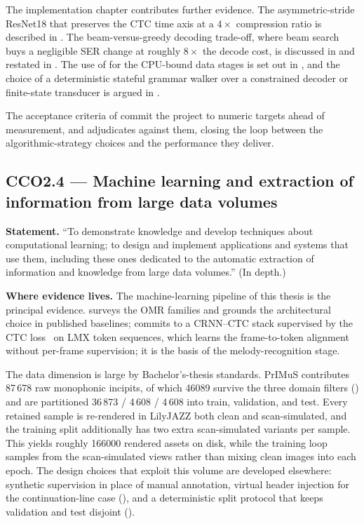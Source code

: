 The implementation chapter contributes further evidence. The
asymmetric-stride ResNet18 that preserves the CTC time axis at a
\(4\times\) compression ratio is described in .
The beam-versus-greedy decoding trade-off, where beam search buys a
negligible SER change at roughly $8\times$ the decode cost, is
discussed in  and restated in
. The use of  for the
CPU-bound data stages is set out in , and the
choice of a deterministic stateful grammar walker over a constrained
decoder or finite-state transducer is argued in
.

The acceptance criteria of  commit the
project to numeric targets ahead of measurement, and 
adjudicates against them, closing the loop between the
algorithmic-strategy choices and the performance they deliver.

\subsection{CCO2.4 — Machine learning and extraction of information
from large data volumes}

\textbf{Statement.}
``To demonstrate knowledge and develop techniques about computational
learning; to design and implement applications and systems that use
them, including these ones dedicated to the automatic extraction of
information and knowledge from large data volumes.'' (In depth.)

\textbf{Where evidence lives.}
The machine-learning pipeline of this thesis is the principal
evidence.  surveys the OMR families and grounds the
architectural choice in published baselines; 
commits to a CRNN--CTC stack supervised by the CTC
loss~\cite{gravesConnectionistTemporal2006} on LMX token sequences,
which learns the frame-to-token alignment without per-frame
supervision; it is the basis of the melody-recognition stage.

The data dimension is large by Bachelor's-thesis standards. PrIMuS
contributes 87\,678 raw monophonic incipits, of which \num{46089}
survive the three domain filters () and are
partitioned 36\,873 / 4\,608 / 4\,608 into train, validation, and test.
Every retained sample is re-rendered in LilyJAZZ both clean and
scan-simulated, and the training split additionally has two extra
scan-simulated variants per sample. This yields roughly \num{166000}
rendered assets on disk, while the training loop samples from the
scan-simulated views rather than mixing clean images into each epoch.
The design choices that exploit this volume
are developed elsewhere: synthetic supervision in place of manual
annotation, virtual header injection for the
continuation-line case (), and a deterministic
split protocol that keeps validation and test disjoint
().

